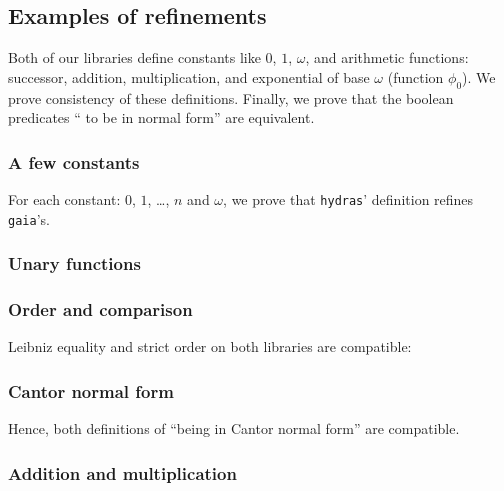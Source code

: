 

\subsection{Examples of refinements}
Both of our libraries define constants like $0$, $1$, $\omega$, and arithmetic functions: successor, addition, multiplication, and exponential of base $\omega$ (function $\phi_0$). We prove consistency of these definitions. Finally, we prove that the boolean predicates `` to be in normal form'' are equivalent.

\subsubsection{A few constants}
For each constant: $0$, $1$, \dots, $n$ and $\omega$, we prove
that \texttt{hydras}' definition refines \texttt{gaia}'s.


\subsubsection{Unary functions}


\subsubsection{Order and comparison}
Leibniz equality and strict order on both libraries are
compatible:



\label{sect:gaia-compare-ref}



\subsubsection{Cantor normal form}

Hence, both definitions of ``being in Cantor normal form'' are
compatible.



\subsubsection{Addition and multiplication}

